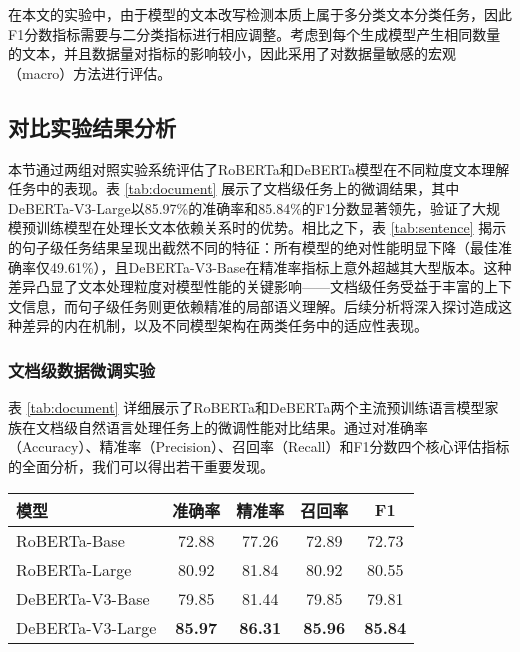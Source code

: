 在本文的实验中，由于模型的文本改写检测本质上属于多分类文本分类任务，因此F1分数指标需要与二分类指标进行相应调整。考虑到每个生成模型产生相同数量的文本，并且数据量对指标的影响较小，因此采用了对数据量敏感的宏观（macro）方法进行评估。

\subsection{对比实验结果分析}
\label{sec:method-experiment-main}

本节通过两组对照实验系统评估了RoBERTa和DeBERTa模型在不同粒度文本理解任务中的表现。表 \ref{tab:document} 展示了文档级任务上的微调结果，其中DeBERTa-V3-Large以85.97\%的准确率和85.84\%的F1分数显著领先，验证了大规模预训练模型在处理长文本依赖关系时的优势。相比之下，表 \ref{tab:sentence} 揭示的句子级任务结果呈现出截然不同的特征：所有模型的绝对性能明显下降（最佳准确率仅49.61\%），且DeBERTa-V3-Base在精准率指标上意外超越其大型版本。这种差异凸显了文本处理粒度对模型性能的关键影响——文档级任务受益于丰富的上下文信息，而句子级任务则更依赖精准的局部语义理解。后续分析将深入探讨造成这种差异的内在机制，以及不同模型架构在两类任务中的适应性表现。

\subsubsection{文档级数据微调实验}

表 \ref{tab:document} 详细展示了RoBERTa和DeBERTa两个主流预训练语言模型家族在文档级自然语言处理任务上的微调性能对比结果。通过对准确率（Accuracy）、精准率（Precision）、召回率（Recall）和F1分数四个核心评估指标的全面分析，我们可以得出若干重要发现。

\begin{table*}[htbp]
\caption{RoBERTa 与 DeBERTa 模型在文档级数据上微调结果}
\centering
\begin{tabular}{l|cccc}
\toprule
\textbf{模型}& \textbf{准确率}   & \textbf{精准率}    & \textbf{召回率}    & \textbf{F1}   \\ \midrule
RoBERTa-Base \cite{liu_roberta_2019}  & 72.88          & 77.26          & 72.89          & 72.73          \\
RoBERTa-Large \cite{liu_roberta_2019} & 80.92          & 81.84          & 80.92          & 80.55          \\
DeBERTa-V3-Base \cite{he2023debertav3improvingdebertausing} & 79.85          & 81.44          & 79.85          & 79.81          \\
DeBERTa-V3-Large \cite{he2023debertav3improvingdebertausing} & \textbf{85.97} & \textbf{86.31} & \textbf{85.96} & \textbf{85.84} \\ \bottomrule
\end{tabular}
\label{tab:document}
\end{table*}


